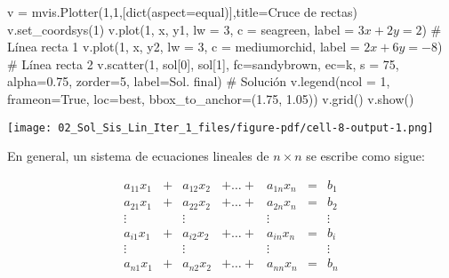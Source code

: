 \documentclass[
  letterpaper,
  DIV=11,
  numbers=noendperiod]{scrreprt}
\newenvironment{Shaded}{\begin{snugshade}}{\end{snugshade}}
\newcommand{\BuiltInTok}[1]{\textcolor[rgb]{0.00,0.23,0.31}{#1}}
\newcommand{\CommentTok}[1]{\textcolor[rgb]{0.37,0.37,0.37}{#1}}
\newcommand{\DecValTok}[1]{\textcolor[rgb]{0.68,0.00,0.00}{#1}}
\newcommand{\FloatTok}[1]{\textcolor[rgb]{0.68,0.00,0.00}{#1}}
\newcommand{\NormalTok}[1]{\textcolor[rgb]{0.00,0.23,0.31}{#1}}
\newcommand{\OperatorTok}[1]{\textcolor[rgb]{0.37,0.37,0.37}{#1}}
\newcommand{\StringTok}[1]{\textcolor[rgb]{0.13,0.47,0.30}{#1}}
\newcommand{\VariableTok}[1]{\textcolor[rgb]{0.07,0.07,0.07}{#1}}
\begin{document}
\begin{Shaded}
\begin{Highlighting}[]
\NormalTok{v }\OperatorTok{=}\NormalTok{ mvis.Plotter(}\DecValTok{1}\NormalTok{,}\DecValTok{1}\NormalTok{,[}\BuiltInTok{dict}\NormalTok{(aspect}\OperatorTok{=}\StringTok{\textquotesingle{}equal\textquotesingle{}}\NormalTok{)],title}\OperatorTok{=}\StringTok{\textquotesingle{}Cruce de rectas\textquotesingle{}}\NormalTok{) }
\NormalTok{v.set\_coordsys(}\DecValTok{1}\NormalTok{)}
\NormalTok{v.plot(}\DecValTok{1}\NormalTok{, x, y1, lw }\OperatorTok{=} \DecValTok{3}\NormalTok{, c }\OperatorTok{=} \StringTok{\textquotesingle{}seagreen\textquotesingle{}}\NormalTok{, label }\OperatorTok{=} \StringTok{\textquotesingle{}$3x+2y=2$\textquotesingle{}}\NormalTok{) }\CommentTok{\# Línea recta 1}
\NormalTok{v.plot(}\DecValTok{1}\NormalTok{, x, y2, lw }\OperatorTok{=} \DecValTok{3}\NormalTok{, c }\OperatorTok{=} \StringTok{\textquotesingle{}mediumorchid\textquotesingle{}}\NormalTok{, label }\OperatorTok{=} \StringTok{\textquotesingle{}$2x+6y={-}8$\textquotesingle{}}\NormalTok{) }\CommentTok{\# Línea recta 2}
\NormalTok{v.scatter(}\DecValTok{1}\NormalTok{, sol[}\DecValTok{0}\NormalTok{], sol[}\DecValTok{1}\NormalTok{], fc}\OperatorTok{=}\StringTok{\textquotesingle{}sandybrown\textquotesingle{}}\NormalTok{, ec}\OperatorTok{=}\StringTok{\textquotesingle{}k\textquotesingle{}}\NormalTok{, s }\OperatorTok{=} \DecValTok{75}\NormalTok{, alpha}\OperatorTok{=}\FloatTok{0.75}\NormalTok{, zorder}\OperatorTok{=}\DecValTok{5}\NormalTok{, label}\OperatorTok{=}\StringTok{\textquotesingle{}Sol. final\textquotesingle{}}\NormalTok{) }\CommentTok{\# Solución}
\NormalTok{v.legend(ncol }\OperatorTok{=} \DecValTok{1}\NormalTok{, frameon}\OperatorTok{=}\VariableTok{True}\NormalTok{, loc}\OperatorTok{=}\StringTok{\textquotesingle{}best\textquotesingle{}}\NormalTok{, bbox\_to\_anchor}\OperatorTok{=}\NormalTok{(}\FloatTok{1.75}\NormalTok{, }\FloatTok{1.05}\NormalTok{))}
\NormalTok{v.grid()}
\NormalTok{v.show()}
\end{Highlighting}
\end{Shaded}

\texttt{[image: 02\_Sol\_Sis\_Lin\_Iter\_1\_files/figure-pdf/cell-8-output-1.png]}

En general, un sistema de ecuaciones lineales de \(n \times n\) se
escribe como sigue:

\[
\begin{array}{ccccccc}
a_{11}x_1 & + & a_{12}x_2 & +  \dots  + & a_{1n}x_n & = & b_1 \\
a_{21}x_1 & + & a_{22}x_2 & +  \dots + & a_{2n}x_n & = & b_2 \\
\vdots & & \vdots &  & \vdots & & \vdots \\
a_{i1}x_1 & + & a_{i2}x_2 & +  \dots + & a_{in}x_n & = & b_i \\
\vdots & & \vdots &  & \vdots & & \vdots \\
a_{n1}x_1 & + & a_{n2}x_2 & + \dots + & a_{nn}x_n & = & b_n
\end{array}
\]
\end{document}

